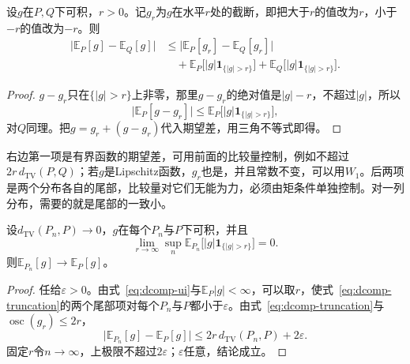 \begin{lemma}[截断分解]
\label{lem:dcomp-truncation}
设$g$在$P,Q$下可积，$r>0$。记$g_r$为$g$在水平$r$处的截断，即把大于$r$的值改为$r$，小于$-r$的值改为$-r$。则
\begin{equation}
 \begin{aligned}
 \bigl\lvert\mathbb{E}_{P}[g]-\mathbb{E}_{Q}[g]\bigr\rvert&\leq\bigl\lvert\mathbb{E}_{P}[g_r]-\mathbb{E}_{Q}[g_r]\bigr\rvert\\
 &\quad+\mathbb{E}_{P}\bigl[\lvert g\rvert\mathbf{1}_{\{\lvert g\rvert>r\}}\bigr]+\mathbb{E}_{Q}\bigl[\lvert g\rvert\mathbf{1}_{\{\lvert g\rvert>r\}}\bigr] .
 \end{aligned}
 \label{eq:dcomp-truncation}
\end{equation}
\end{lemma}

\begin{proof}
$g-g_r$只在$\{\lvert g\rvert>r\}$上非零，那里$g-g_r$的绝对值是$\lvert g\rvert-r$，不超过$\lvert g\rvert$，所以
\[
 \bigl\lvert\mathbb{E}_{P}[g-g_r]\bigr\rvert\leq\mathbb{E}_{P}\bigl[\lvert g\rvert\mathbf{1}_{\{\lvert g\rvert>r\}}\bigr],
\]
对$Q$同理。把$g=g_r+(g-g_r)$代入期望差，用三角不等式即得。
\end{proof}

右边第一项是有界函数的期望差，可用前面的比较量控制，例如不超过$2r\,d_{\mathrm{TV}}(P,Q)$；若$g$是Lipschitz函数，$g_r$也是，并且常数不变，可以用$W_1$。后两项是两个分布各自的尾部，比较量对它们无能为力，必须由矩条件单独控制。对一列分布，需要的就是尾部的一致小。

\begin{theorem}[一致可积时期望收敛]
\label{thm:dcomp-ui-convergence}
设$d_{\mathrm{TV}}(P_n,P)\to0$，$g$在每个$P_n$与$P$下可积，并且
\begin{equation}
 \lim_{r\to\infty}\sup_{n}\mathbb{E}_{P_n}\bigl[\lvert g\rvert\mathbf{1}_{\{\lvert g\rvert>r\}}\bigr]=0 .
 \label{eq:dcomp-ui}
\end{equation}
则$\mathbb{E}_{P_n}[g]\to\mathbb{E}_{P}[g]$。
\end{theorem}

\begin{proof}
任给$\varepsilon>0$。由式~\eqref{eq:dcomp-ui}与$\mathbb{E}_{P}\lvert g\rvert<\infty$，可以取$r$，使式~\eqref{eq:dcomp-truncation}的两个尾部项对每个$P_n$与$P$都小于$\varepsilon$。由式~\eqref{eq:dcomp-truncation}与$\operatorname{osc}(g_r)\leq2r$，
\[
 \bigl\lvert\mathbb{E}_{P_n}[g]-\mathbb{E}_{P}[g]\bigr\rvert\leq2r\,d_{\mathrm{TV}}(P_n,P)+2\varepsilon .
\]
固定$r$令$n\to\infty$，上极限不超过$2\varepsilon$；$\varepsilon$任意，结论成立。
\end{proof}

